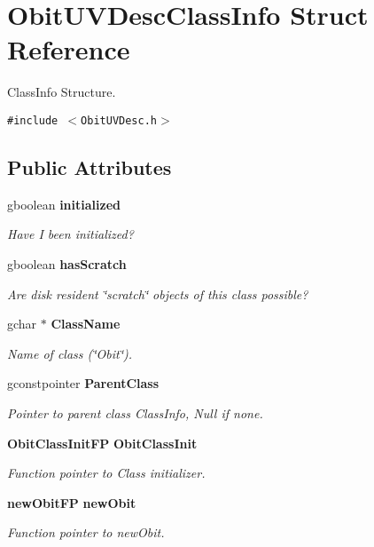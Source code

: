 \section{Obit\-UVDesc\-Class\-Info Struct Reference}
\label{structObitUVDescClassInfo}
Class\-Info Structure.  


{\tt \#include $<$Obit\-UVDesc.h$>$}

\subsection*{Public Attributes}
\begin{CompactItemize}
\item 
gboolean {\bf initialized}
\begin{CompactList}\small\item\em Have I been initialized? \item\end{CompactList}\item 
gboolean {\bf has\-Scratch}
\begin{CompactList}\small\item\em Are disk resident \char`\"{}scratch\char`\"{} objects of this class possible? \item\end{CompactList}\item 
gchar $\ast$ {\bf Class\-Name}
\begin{CompactList}\small\item\em Name of class (\char`\"{}Obit\char`\"{}). \item\end{CompactList}\item 
gconstpointer {\bf Parent\-Class}
\begin{CompactList}\small\item\em Pointer to parent class Class\-Info, Null if none. \item\end{CompactList}\item 
{\bf Obit\-Class\-Init\-FP} {\bf Obit\-Class\-Init}
\begin{CompactList}\small\item\em Function pointer to Class initializer. \item\end{CompactList}\item 
{\bf new\-Obit\-FP} {\bf new\-Obit}
\begin{CompactList}\small\item\em Function pointer to new\-Obit. \item\end{CompactList}\item 

\end{CompactItemize}
